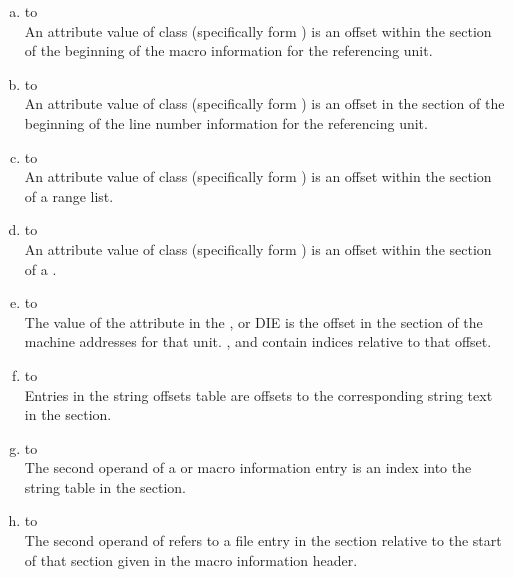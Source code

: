 \begin{enumerate}[(a)]
\item \dotdebuginfo{} to \dotdebugmacro \\
An attribute value of class 
 (specifically form
\DWFORMsecoffset) is an 
offset within the 
\dotdebugmacro{} section
of the beginning of the macro information for the referencing unit.

\item \dotdebuginfo{} to \dotdebugline \\
An attribute value of class 
 (specifically form
\DWFORMsecoffset) 
is an offset in the 
\dotdebugline{} section of the
beginning of the line number information for the referencing unit.

\item \dotdebuginfo{} to \dotdebugranges \\
An attribute value of class  
(specifically form
\DWFORMsecoffset) 
is an offset within the \dotdebugranges{} section of
a range list.

\item \dotdebuginfo{} to \dotdebugloc \\
An attribute value of class  
(specifically form
\DWFORMsecoffset) 
is an offset within the \dotdebugloc{} 
section of a
.

\item \dotdebuginfo{} to \dotdebugaddr \\
The value of the \DWATaddrbase{} attribute in the
\DWTAGcompileunit{}, \DWTAGtypeunit{} or \DWTAGpartialunit{} DIE is the
offset in the \dotdebugaddr{} section of the machine
addresses for that unit.
\DWFORMaddrx, \DWOPaddrx{} and \DWOPconstx{} contain
indices relative to that offset.

\item \dotdebugstroffsets{} to \dotdebugstr \\
Entries in the string offsets table
are offsets to the corresponding string text in the 
\dotdebugstr{} section.

\item \dotdebugmacro{} to \dotdebugstroffsets \\
The second operand of a 
\DWMACROdefineindirect{} or \DWMACROundefindirect{} macro information
entry is an index into the string table in the 
\dotdebugstr{} section.


\item \dotdebugmacro{} to \dotdebugline \\
The second operand of 
\DWMACROstartfile{} refers to a file entry in the 
\dotdebugline{} section relative to the start 
of that section given in the macro information header.


\end{enumerate}
